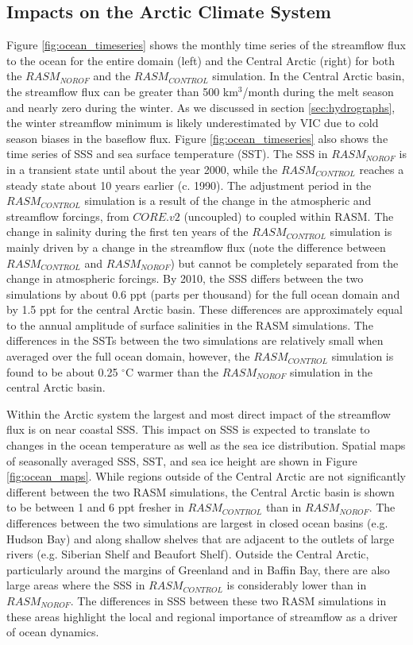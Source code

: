 \documentclass[jgrga, draft]{agutex}
\begin{document}
\begin{article}
\subsection{Impacts on the Arctic Climate System}
\label{sec:ocean}
Figure \ref{fig:ocean_timeseries} shows the monthly time series of the streamflow flux to the ocean for the entire domain (left) and the Central Arctic (right) for both the $RASM_{NOROF}$ and the $RASM_{CONTROL}$ simulation.
In the Central Arctic basin, the streamflow flux can be greater than 500 km$^3$/month during the melt season and nearly zero during the winter.
As we discussed in section \ref{sec:hydrographs}, the winter streamflow minimum is likely underestimated by VIC due to cold season biases in the baseflow flux.
Figure \ref{fig:ocean_timeseries} also shows the time series of SSS and sea surface temperature (SST).
The SSS in $RASM_{NOROF}$ is in a transient state until about the year 2000, while the $RASM_{CONTROL}$ reaches a steady state about 10 years earlier (c. 1990).
The adjustment period in the $RASM_{CONTROL}$ simulation is a result of the change in the atmospheric and streamflow forcings, from $CORE.v2$ (uncoupled) to coupled within RASM.
The change in salinity during the first ten years of the $RASM_{CONTROL}$ simulation is mainly driven by a change in the streamflow flux (note the difference between $RASM_{CONTROL}$ and $RASM_{NOROF}$) but cannot be completely separated from the change in atmospheric forcings.
By 2010, the SSS differs between the two simulations by about 0.6 ppt (parts per thousand) for the full ocean domain and by 1.5 ppt for the central Arctic basin.
These differences are approximately equal to the annual amplitude of surface salinities in the RASM simulations.
The differences in the SSTs between the two simulations are relatively small when averaged over the full ocean domain, however, the $RASM_{CONTROL}$ simulation is found to be about 0.25 $^{\circ}$C warmer than the $RASM_{NOROF}$ simulation in the central Arctic basin.

Within the Arctic system the largest and most direct impact of the streamflow flux is on near coastal SSS.
This impact on SSS is expected to translate to changes in the ocean temperature as well as the sea ice distribution.
Spatial maps of seasonally averaged SSS, SST, and sea ice height are shown in Figure \ref{fig:ocean_maps}.
While regions outside of the Central Arctic are not significantly different between the two RASM simulations, the Central Arctic basin is shown to be between 1 and 6 ppt fresher in $RASM_{CONTROL}$ than in $RASM_{NOROF}$.
The differences between the two simulations are largest in closed ocean basins (e.g. Hudson Bay) and along shallow shelves that are adjacent to the outlets of large rivers (e.g. Siberian Shelf and Beaufort Shelf).
Outside the Central Arctic, particularly around the margins of Greenland and in Baffin Bay, there are also large areas where the SSS in $RASM_{CONTROL}$ is considerably lower than in $RASM_{NOROF}$.
The differences in SSS between these two RASM simulations in these areas highlight the local and regional importance of streamflow as a driver of ocean dynamics.


\end{article}
\end{document}

